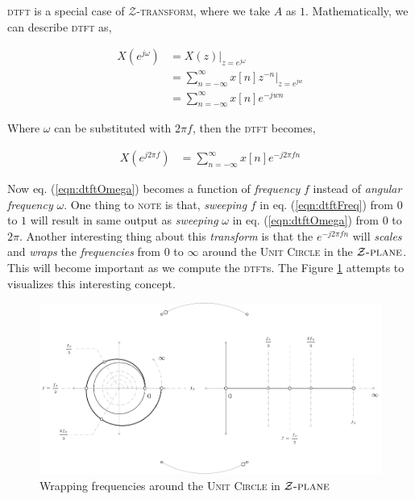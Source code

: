 \documentclass[../../course]{subfiles}
\begin{document}
\textsc{dtft} is a special case of $\mathcal{Z}$\textsc{-transform}, where we take $A$
as $1$. Mathematically, we can describe \textsc{dtft} as,

\begin{align}
    X(e^{j \omega}) &= X(z) |_{z = e^{j \omega}} \\
    &= \sum_{n = - \infty}^{\infty} x[n] z^{-n} \Big|_{z = e^{jw}} \\
    &= \sum_{n = - \infty}^{\infty} x[n] e^{-j w n} \label{eqn:dtftOmega}
\end{align}

Where $\omega$ can be substituted with $2 \pi f$, then the \textsc{dtft} becomes,

\begin{align}
    X(e^{j 2 \pi f}) &= \sum_{n = - \infty}^{\infty} x[n] e^{-j 2 \pi f n}
    \label{eqn:dtftFreq}
\end{align}

Now eq. (\ref{eqn:dtftOmega}) becomes a function of \emph{frequency} $f$
instead of \emph{angular frequency} $\omega$. One thing to \textsc{note} is that,
\emph{sweeping} $f$ in eq. (\ref{eqn:dtftFreq}) from $0$ to $1$ will result in same
output as \emph{sweeping} $\omega$ in eq. (\ref{eqn:dtftOmega}) from $0$ to $2 \pi$.
Another interesting thing about this \emph{transform} is that the $e^{-j 2 \pi f n}$ will
\emph{scales} and \emph{wraps} the \emph{frequencies} from $0$ to $\infty$ around
the \textsc{Unit Circle} in the $\mathcal{Z} \textsc{-plane}$. This will become
important as we compute the \textsc{dtft}s. The Figure \ref{fig:wrapFreqUnitCircle}
attempts to visualizes this interesting concept.

\begin{figure}
    \centering
     {
        \includegraphics[height = 1\textheight] {tikzpics/epicWrapFreqUnitCircle.pdf}
    }
     {
        Wrapping frequencies around the \textsc{Unit Circle} in $\mathcal{Z}\textsc{-plane}$
    }
    \label{fig:wrapFreqUnitCircle}
\end{figure}
\end{document}
